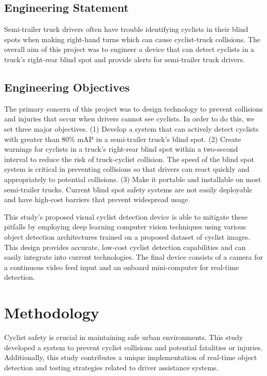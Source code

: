 \documentclass{article}
\begin{document}
\subsection{Engineering Statement}
Semi-trailer truck drivers often have trouble identifying cyclists in their blind spots when making right-hand turns which can cause cyclist-truck collisions. The overall aim of this project was to engineer a device that can detect cyclists in a truck’s right-rear blind spot and provide alerts for semi-trailer truck drivers. 

\subsection{Engineering Objectives}
The primary concern of this project was to design technology to prevent collisions and injuries that occur when drivers cannot see cyclists. In order to do this, we set three major objectives. (1) Develop a system that can actively detect cyclists with greater than 80\% mAP in a semi-trailer truck’s blind spot. (2) Create warnings for cyclists in a truck’s right-rear blind spot within a two-second interval to reduce the risk of truck-cyclist collision. The speed of the blind spot system is critical in preventing collisions so that drivers can react quickly and appropriately to potential collisions. (3) Make it portable and installable on most semi-trailer trucks. Current blind spot safety systems are not easily deployable and have high-cost barriers that prevent widespread usage. 

This study’s proposed visual cyclist detection device is able to mitigate these pitfalls by employing deep learning computer vision techniques using various object detection architectures trained on a proposed dataset of cyclist images. This design provides accurate, low-cost cyclist detection capabilities and can easily integrate into current technologies. The final device consists of a camera for a continuous video feed input and an onboard mini-computer for real-time detection. 

\section{Methodology}
Cyclist safety is crucial in maintaining safe urban environments. This study developed a system to prevent cyclist collisions and potential fatalities or injuries. Additionally, this study contributes a unique implementation of real-time object detection and testing strategies related to driver assistance systems.
\end{document}
